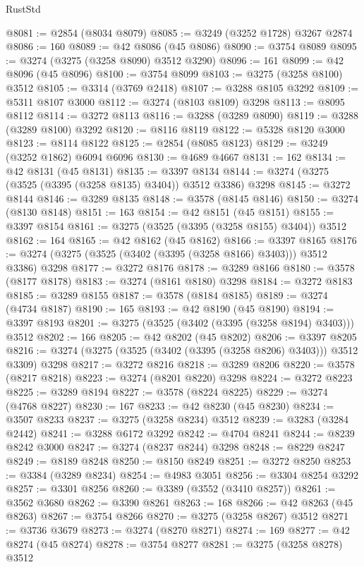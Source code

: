 \begin{lexlean}{RustStd}
\begin{coremodule}
@8081 := @2854 (@8034 @8079)
@8085 := @3249 (@3252 @1728) @3267 @2874
@8086 := 160
@8089 := @42 @8086 (@45 @8086)
@8090 := @3754 @8089
@8095 := @3274 (@3275 (@3258 @8090) @3512 @3290)
@8096 := 161
@8099 := @42 @8096 (@45 @8096)
@8100 := @3754 @8099
@8103 := @3275 (@3258 @8100) @3512
@8105 := @3314 (@3769 @2418)
@8107 := @3288 @8105 @3292
@8109 := @5311 @8107 @3000
@8112 := @3274 (@8103 @8109) @3298
@8113 := @8095 @8112
@8114 := @3272 @8113
@8116 := @3288 (@3289 @8090)
@8119 := @3288 (@3289 @8100) @3292
@8120 := @8116 @8119
@8122 := @5328 @8120 @3000
@8123 := @8114 @8122
@8125 := @2854 (@8085 @8123)
@8129 := @3249 (@3252 @1862) @6094 @6096
@8130 := @4689 @4667
@8131 := 162
@8134 := @42 @8131 (@45 @8131)
@8135 := @3397 @8134
@8144 := @3274 (@3275 (@3525 (@3395 (@3258 @8135) @3404)) @3512 @3386) @3298
@8145 := @3272 @8144
@8146 := @3289 @8135
@8148 := @3578 (@8145 @8146)
@8150 := @3274 (@8130 @8148)
@8151 := 163
@8154 := @42 @8151 (@45 @8151)
@8155 := @3397 @8154
@8161 := @3275 (@3525 (@3395 (@3258 @8155) @3404)) @3512
@8162 := 164
@8165 := @42 @8162 (@45 @8162)
@8166 := @3397 @8165
@8176 := @3274 (@3275 (@3525 (@3402 (@3395 (@3258 @8166) @3403))) @3512 @3386) @3298
@8177 := @3272 @8176
@8178 := @3289 @8166
@8180 := @3578 (@8177 @8178)
@8183 := @3274 (@8161 @8180) @3298
@8184 := @3272 @8183
@8185 := @3289 @8155
@8187 := @3578 (@8184 @8185)
@8189 := @3274 (@4734 @8187)
@8190 := 165
@8193 := @42 @8190 (@45 @8190)
@8194 := @3397 @8193
@8201 := @3275 (@3525 (@3402 (@3395 (@3258 @8194) @3403))) @3512
@8202 := 166
@8205 := @42 @8202 (@45 @8202)
@8206 := @3397 @8205
@8216 := @3274 (@3275 (@3525 (@3402 (@3395 (@3258 @8206) @3403))) @3512 @3309) @3298
@8217 := @3272 @8216
@8218 := @3289 @8206
@8220 := @3578 (@8217 @8218)
@8223 := @3274 (@8201 @8220) @3298
@8224 := @3272 @8223
@8225 := @3289 @8194
@8227 := @3578 (@8224 @8225)
@8229 := @3274 (@4768 @8227)
@8230 := 167
@8233 := @42 @8230 (@45 @8230)
@8234 := @3507 @8233
@8237 := @3275 (@3258 @8234) @3512
@8239 := @3283 (@3284 @2442)
@8241 := @3288 @6172 @3292
@8242 := @4704 @8241
@8244 := @8239 @8242 @3000
@8247 := @3274 (@8237 @8244) @3298
@8248 := @8229 @8247
@8249 := @8189 @8248
@8250 := @8150 @8249
@8251 := @3272 @8250
@8253 := @3384 (@3289 @8234)
@8254 := @4983 @3051
@8256 := @3304 @8254 @3292
@8257 := @3301 @8256
@8260 := @3389 (@3552 (@3410 @8257))
@8261 := @3562 @3680
@8262 := @3390 @8261
@8263 := 168
@8266 := @42 @8263 (@45 @8263)
@8267 := @3754 @8266
@8270 := @3275 (@3258 @8267) @3512
@8271 := @3736 @3679
@8273 := @3274 (@8270 @8271)
@8274 := 169
@8277 := @42 @8274 (@45 @8274)
@8278 := @3754 @8277
@8281 := @3275 (@3258 @8278) @3512

\end{coremodule}
\end{lexlean}
